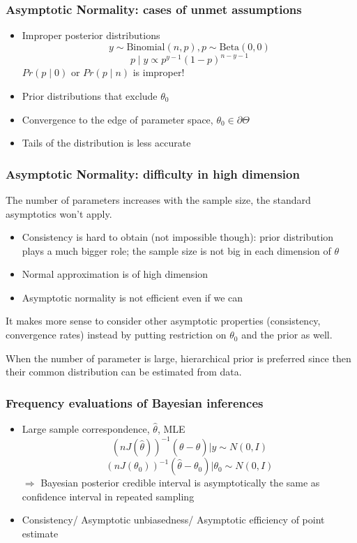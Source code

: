 \documentclass{beamer}
\begin{document}
\begin{frame}
\frametitle{Asymptotic Normality: cases of unmet assumptions}
\begin{itemize}
\item Improper posterior distributions
\[  
   y \sim \mbox{Binomial}(n, p), p \sim \mbox{Beta}(0, 0)
\]
\[
  p \mid y  \propto p^{y-1}(1 - p)^{n-y-1}
\]
$Pr(p \mid 0)$ or $Pr(p \mid n)$ is improper! 
\item Prior distributions that exclude $\theta_0$
\item Convergence to the edge of parameter space, $\theta_0
  \in \partial\Theta$
\item Tails of the distribution is less accurate  
\end{itemize}
\end{frame}


\begin{frame}
\frametitle{Asymptotic Normality: difficulty in high dimension}

The number of parameters increases with the sample size, the standard
asymptotics won't apply. 

\begin{itemize}
\item Consistency is hard to obtain (not impossible though): prior
  distribution plays a much bigger role; the sample size is not big
  in each dimension of $\theta$
\item Normal approximation is of high dimension
\item Asymptotic normality is not efficient even if we can
\end{itemize}


It makes more sense to consider other asymptotic properties
(consistency, convergence rates) instead by putting restriction on
$\theta_0$ and the prior as well.

When the number of parameter is large, hierarchical prior is preferred
since then their common distribution can be estimated from data.
\end{frame}

\begin{frame}
  \frametitle{Frequency evaluations of Bayesian inferences}
  \begin{itemize}
  \item Large sample correspondence, $\hat{\theta}$, MLE
\[
 (n J(\hat{\theta}))^{-1}(\theta - \hat{\theta}) |
 y \sim N(0, I)
\]
\[
(n J(\theta_0))^{-1}(\hat{\theta} - \theta_0) |
 \theta_0 \sim N(0, I)
\]
$\Rightarrow$ Bayesian posterior credible interval is asymptotically
the same as confidence interval in repeated sampling 
 \item Consistency/ Asymptotic unbiasedness/ Asymptotic efficiency of point estimate
  \end{itemize}
\end{frame}
\end{document}
